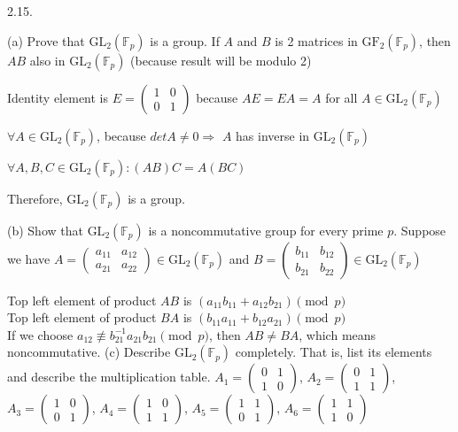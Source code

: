 2.15. 
 
(a) Prove that $\text{GL}_2(\mathbb{F}_p)$ is a group.
    If $A$ and $B$ is 2 matrices in $\text{GF}_2(\mathbb{F}_p)$, then $AB$ also in $\text{GL}_2(\mathbb{F}_p)$ (because result will be modulo 2)
    
    Identity element is $E = \begin{pmatrix}1 & 0\\0 & 1\end{pmatrix}$ because $AE=EA=A$ for all $A \in \text{GL}_2(\mathbb{F}_p)$
    
    $\forall A \in \text{GL}_2(\mathbb{F}_p)$, because $detA \neq 0 \Rightarrow$ $A$ has inverse in $\text{GL}_2(\mathbb{F}_p)$
    
    $\forall A, B, C \in \text{GL}_2(\mathbb{F}_p): (AB)C=A(BC)$
    
    Therefore, $\text{GL}_2(\mathbb{F}_p)$ is a group.

 (b) Show that $\text{GL}_2(\mathbb{F}_p)$ is a noncommutative group for every prime $p$.
    Suppose we have $A = \begin{pmatrix}a_{11} & a_{12} \\ a_{21} & a_{22}\end{pmatrix} \in \text{GL}_2(\mathbb{F}_p)$ and $B=\begin{pmatrix}b_{11} & b_{12} \\ b_{21} & b_{22}\end{pmatrix} \in \text{GL}_2(\mathbb{F}_p)$
    
    Top left element of product $AB$ is $(a_{11}b_{11}+a_{12}b_{21}) \pmod p$ \\ Top left element of product $BA$ is $(b_{11}a_{11} + b_{12}a_{21}) \pmod p$ \\ If we choose $a_{12} \not\equiv b_{21}^{-1}a_{21}b_{21} \pmod p$, then $AB \neq BA$, which means noncommutative.
 (c) Describe $\text{GL}_2(\mathbb{F}_p)$ completely. That is, list its elements and describe the multiplication table.
    $A_1 = \begin{pmatrix}0 & 1\\1 & 0\end{pmatrix}$, $A_2 = \begin{pmatrix}0 & 1\\1 & 1\end{pmatrix}$, $A_3 = \begin{pmatrix}1 & 0\\0 & 1\end{pmatrix}$, $A_4 = \begin{pmatrix}1 & 0\\1 & 1\end{pmatrix}$, $A_5 = \begin{pmatrix}1 & 1\\0 & 1\end{pmatrix}$, $A_6 = \begin{pmatrix}1 & 1\\1 & 0\end{pmatrix}$
    
